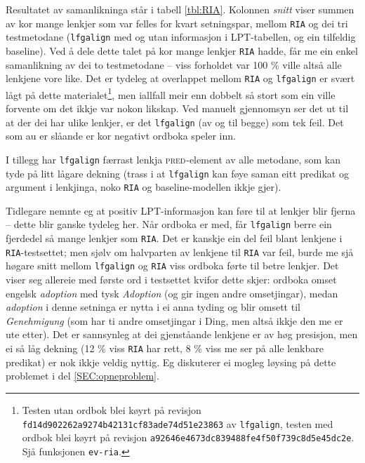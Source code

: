 \documentclass[11pt,a4paper,oneside,draft]{report}
\newcommand{\F}[2]{\textsc{#1}\ensuremath{_{#2}}}
\newcommand{\PRED}{\F{pred}{}}
\begin{document}
 Resultatet av samanlikninga står i tabell \ref{tbl:RIA}. Kolonnen
 \emph{snitt} viser summen av kor mange lenkjer som var felles for kvart
 setningspar, mellom \texttt{RIA} og dei tri testmetodane (\texttt{lfgalign} med og
 utan informasjon i LPT-tabellen, og ein tilfeldig baseline). Ved å
 dele dette talet på kor mange lenkjer \texttt{RIA} hadde, får me ein enkel
 samanlikning av dei to testmetodane -- viss forholdet var 100 \% ville
 altså alle lenkjene vore like.  Det er tydeleg at overlappet mellom
 \texttt{RIA} og \texttt{lfgalign} er svært lågt på dette materialet\footnote{Testen utan ordbok blei køyrt på revisjon
        \texttt{fd14d902262a9274b42131cf83ade74d51e23863} av \texttt{lfgalign},
        testen med ordbok blei køyrt på revisjon
        \texttt{a92646e4673dc839488fe4f50f739c8d5e45dc2e}.  Sjå funksjonen
        \texttt{ev-ria}. }, men
 iallfall meir enn dobbelt så stort som ein ville forvente om det
 ikkje var nokon likskap. Ved manuelt gjennomsyn ser det ut til at der
 dei har ulike lenkjer, er det \texttt{lfgalign} (av og til begge) som tek
 feil. Det som au er slåande er kor negativt ordboka speler inn.

 I tillegg har \texttt{lfgalign} færrast lenkja \PRED{}-element av alle
 metodane, som kan tyde på litt lågare dekning (trass i at \texttt{lfgalign}
 kan føye saman eitt predikat og argument i lenkjinga, noko \texttt{RIA} og
 baseline-modellen ikkje gjer). 

 Tidlegare nemnte eg at positiv LPT-informasjon kan føre til at
 lenkjer blir fjerna -- dette blir ganske tydeleg her. Når ordboka er
 med, får \texttt{lfgalign} berre ein fjerdedel så mange lenkjer som \texttt{RIA}.
 Det er kanskje ein del feil blant lenkjene i \texttt{RIA}-testsettet; men
 sjølv om halvparten av lenkjene til \texttt{RIA} var feil, burde me sjå
 høgare snitt mellom \texttt{lfgalign} og \texttt{RIA} viss ordboka førte til betre
 lenkjer. Det viser seg allereie med første ord i testsettet kvifor
 dette skjer: ordboka omset engelsk \emph{adoption} med tysk \emph{Adoption} (og
 gir ingen andre omsetjingar), medan \emph{adoption} i denne setninga er
 nytta i ei anna tyding og blir omsett til \emph{Genehmigung} (som har ti
 andre omsetjingar i Ding, men altså ikkje den me er ute etter).  Det
 er sannsynleg at dei gjenståande lenkjene er av høg presisjon, men ei
 så låg dekning (12 \% viss \texttt{RIA} har rett, 8 \% viss me ser på alle
 lenkbare predikat) er nok ikkje veldig nyttig. Eg diskuterer ei
 mogleg løysing på dette problemet i del \ref{SEC:opneproblem}.
\end{document}
